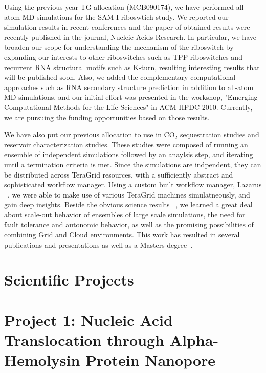 \documentclass[a4paper,10pt]{article}
\begin{document}
Using the previous year TG allocation (MCB090174), we have performed all-atom MD simulations for the SAM-I riboswtich study.   We reported our simulation results in recent conferences and the paper of obtained results were recently published in the journal, Nucleic Acids Research\cite{SAM-I-NAR2009}.  In particular, we have broaden our scope for understanding the mechanism of the riboswitch by expanding our interests to other riboswitches such as TPP riboswitches and recurrent RNA structural motifs such as K-turn, resulting interesting results that will be published soon.  Also, we added the complementary computational approaches such as RNA secondary structure prediction in addition to all-atom MD simulations, and our initial effort was presented in the workshop, "Emerging Computational Methods for the Life Sciences" in ACM HPDC 2010\cite{ecmls10}.  Currently, we are pursuing the funding opportunities based on those results.

We have also put our previous allocation to use in CO$_2$ sequestration studies
and reservoir characterization studies. These studies were composed of running an ensemble
of independent simulations followed by an anaylsis step, and iterating until a termination criteria is met.
Since the simulations are indpendent, they can be distributed across TeraGrid resources, with
a sufficiently abstract and sophisticated workflow manager. Using a custom built workflow manager,
Lazarus ~\cite{gmac}, we were able to make use of various TeraGrid machines simulatneously, and
gain deep insights. Beside the obvious science results ~\cite{TG10yye00}, we learned a great
deal about scale-out behavior of ensembles of large scale simulations, the need for fault
tolerance and autonomic behavior, as well as the promising possibilities of combining
Grid and Cloud environments. This work has resulted in several publications \cite{Cloud1,Cloud2,MSEScience,TG10yye00}  and presentations
as well as a Masters degree~\cite{Elkhamra2009}.


\section{Scientific Projects}



\section*{Project 1: Nucleic Acid Translocation through Alpha-Hemolysin Protein Nanopore}
\end{document}
